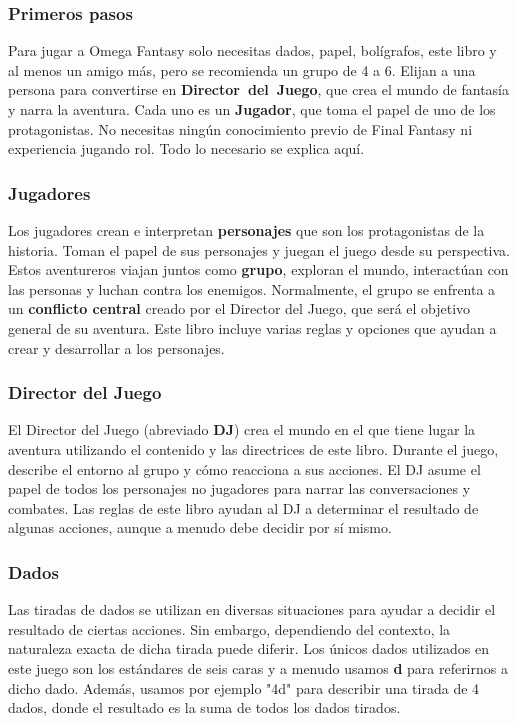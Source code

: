 \vfill

\subsubsection*{Primeros pasos}
Para jugar a Omega Fantasy solo necesitas dados, papel, bolígrafos, este libro y al menos un amigo más, pero se recomienda un grupo de 4 a 6. Elijan a una persona para convertirse en \mbox{\textbf{Director del Juego}}, que crea el mundo de fantasía y narra la aventura. Cada uno es un \textbf{Jugador}, que toma el papel de uno de los protagonistas. No necesitas ningún conocimiento previo de Final Fantasy ni experiencia jugando rol. Todo lo necesario se explica aquí.

\pagebreak

\subsubsection*{Jugadores}
Los jugadores crean e interpretan \textbf{personajes} que son los protagonistas de la historia. Toman el papel de sus personajes y juegan el juego desde su perspectiva. Estos aventureros viajan juntos como \textbf{grupo}, exploran el mundo, interactúan con las personas y luchan contra los enemigos. Normalmente, el grupo se enfrenta a un \textbf{conflicto central} creado por el Director del Juego, que será el objetivo general de su aventura. Este libro incluye varias reglas y opciones que ayudan a crear y desarrollar a los personajes.

\subsubsection*{Director del Juego}
El Director del Juego (abreviado \textbf{DJ}) crea el mundo en el que tiene lugar la aventura utilizando el contenido y las directrices de este libro. Durante el juego, describe el entorno al grupo y cómo reacciona a sus acciones. El DJ asume el papel de todos los personajes no jugadores para narrar las conversaciones y combates. Las reglas de este libro ayudan al DJ a determinar el resultado de algunas acciones, aunque a menudo debe decidir por sí mismo.

\subsubsection*{Dados}
Las tiradas de dados se utilizan en diversas situaciones para ayudar a decidir el resultado de ciertas acciones. Sin embargo, dependiendo del contexto, la naturaleza exacta de dicha tirada puede diferir. Los únicos dados utilizados en este juego son los estándares de seis caras y a menudo usamos \textbf{d} para referirnos a dicho dado. Además, usamos por ejemplo "4d" para describir una tirada de 4 dados, donde el resultado es la suma de todos los dados tirados.


